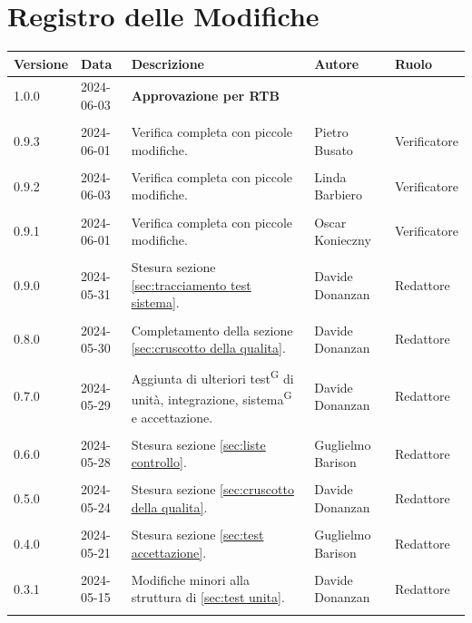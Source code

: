\documentclass[8pt]{article}
\newcommand{\glossterm}[1]{#1\textsuperscript{G}} %
\begin{document}
\section*{Registro delle Modifiche}
\begin{table}[ht!]	
	\centering
	\begin{tabular}{p{1.2cm} p{2cm} p{6cm} p{3cm} p{2cm}}
		\toprule
		\textbf{Versione}& \textbf{Data} & \textbf{Descrizione} & \textbf{Autore} & \textbf{Ruolo} \\
		\midrule
  		1.0.0 & 2024-06-03 & \textbf{Approvazione per RTB} & & \\\\
        0.9.3 & 2024-06-01 & Verifica completa con piccole modifiche. & Pietro Busato & Verificatore \\\\
        0.9.2 & 2024-06-03 & Verifica completa con piccole modifiche. & Linda Barbiero & Verificatore \\\\
        0.9.1 & 2024-06-01 & Verifica completa con piccole modifiche. & Oscar Konieczny & Verificatore \\\\
        0.9.0 & 2024-05-31 & Stesura sezione \ref{sec:tracciamento test sistema}. & Davide Donanzan & Redattore \\\\
        0.8.0 & 2024-05-30 & Completamento della sezione \ref{sec:cruscotto della qualita}. & Davide Donanzan & Redattore \\\\
        0.7.0 & 2024-05-29 & Aggiunta di ulteriori \glossterm{test} di unità, integrazione, \glossterm{sistema} e accettazione. & Davide Donanzan & Redattore \\\\
        0.6.0 & 2024-05-28 & Stesura sezione \ref{sec:liste controllo}. & Guglielmo Barison & Redattore \\\\
        0.5.0 & 2024-05-24 & Stesura sezione \ref{sec:cruscotto della qualita}. & Davide Donanzan & Redattore \\\\
        0.4.0 & 2024-05-21 & Stesura sezione \ref{sec:test accettazione}. & Guglielmo Barison & Redattore \\\\
        0.3.1 & 2024-05-15 & Modifiche minori alla struttura di \ref{sec:test unita}. & Davide Donanzan & Redattore \\\\

\end{tabular}
\end{table}
\end{document}

